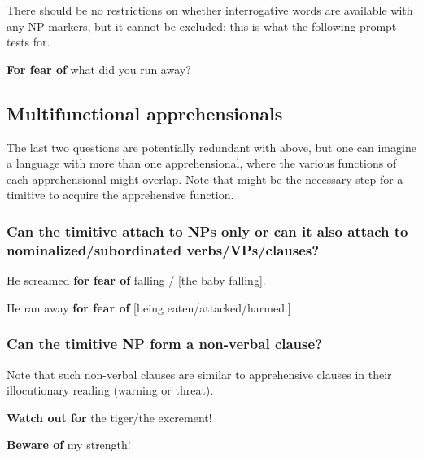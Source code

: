 \documentclass[output=paper,colorlinks,citecolor=brown]{langscibook}
\begin{document}
There should be no restrictions on whether interrogative words are available with any NP markers, but it cannot be excluded; this is what the following prompt tests for.

\ea \label{p73} \textbf{For fear of} what did you run away?
\z


\subsection{Multifunctional apprehensionals}
\label{subsec:timmulti}

The last two questions are potentially redundant with  above, but one can imagine a language with more than one apprehensional, where the various functions of each apprehensional might overlap. Note that  might be the necessary step for a timitive to acquire the apprehensive function.

\subsubsection{Can the timitive attach to NPs only or can it also attach to nominalized/subordinated verbs/VPs/clauses?}
\label{3.6.1}

\ea \label{p74} He screamed \textbf{for fear of} falling \textnormal{/} [the baby falling].
\z

\ea \label{p75} He ran away \textbf{for fear of} [being eaten\textnormal{/}attacked\textnormal{/}harmed.]
\z

\subsubsection{Can the timitive NP form a non-verbal clause? }
\label{3.6.2}

Note that such non-verbal clauses are similar to apprehensive clauses in their illocutionary reading (warning or threat).

\ea \label{p76} \textbf{Watch out for} the tiger\textnormal{/}the excrement!
\z

\ea \label{p77} \textbf{Beware of} my strength!
\z
\end{document}
